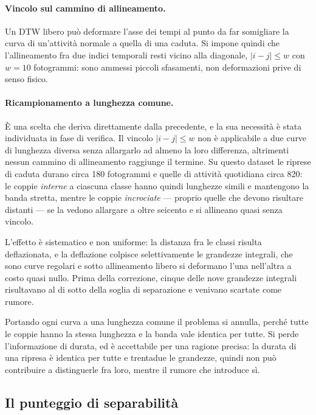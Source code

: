\paragraph{Vincolo sul cammino di allineamento.} Un DTW libero può deformare
l'asse dei tempi al punto da far somigliare la curva di un'attività normale a
quella di una caduta. Si impone quindi che l'allineamento fra due indici
temporali resti vicino alla diagonale, $|i-j| \leq w$ con $w = 10$ fotogrammi:
sono ammessi piccoli sfasamenti, non deformazioni prive di senso fisico.

\paragraph{Ricampionamento a lunghezza comune.} È una scelta che deriva
direttamente dalla precedente, e la sua necessità è stata individuata in fase di
verifica. Il vincolo $|i-j| \leq w$ non è applicabile a due curve di lunghezza
diversa senza allargarlo ad almeno la loro differenza, altrimenti nessun cammino
di allineamento raggiunge il termine. Su questo dataset le riprese di caduta
durano circa 180 fotogrammi e quelle di attività quotidiana circa 820: le coppie
\emph{interne} a ciascuna classe hanno quindi lunghezze simili e mantengono la
banda stretta, mentre le coppie \emph{incrociate} — proprio quelle che devono
risultare distanti — se la vedono allargare a oltre seicento e si allineano
quasi senza vincolo.

L'effetto è sistematico e non uniforme: la distanza fra le classi risulta
deflazionata, e la deflazione colpisce selettivamente le grandezze integrali,
che sono curve regolari e sotto allineamento libero si deformano l'una
nell'altra a costo quasi nullo. Prima della correzione, cinque delle nove
grandezze integrali risultavano al di sotto della soglia di separazione e
venivano scartate come rumore.

Portando ogni curva a una lunghezza comune il problema si annulla, perché tutte
le coppie hanno la stessa lunghezza e la banda vale identica per tutte. Si perde
l'informazione di durata, ed è accettabile per una ragione precisa: la durata di
una ripresa è identica per tutte e trentadue le grandezze, quindi non può
contribuire a distinguerle fra loro, mentre il rumore che introduce sì.

\subsection{Il punteggio di separabilità}

